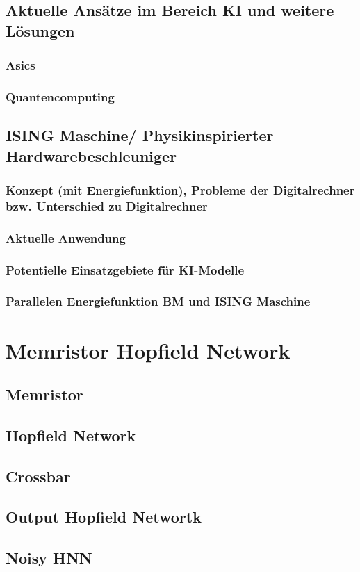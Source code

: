 \subsection{Aktuelle Ansätze im Bereich KI und weitere Lösungen}
\subsubsection{Asics}
\subsubsection{Quantencomputing}
\subsection{ISING Maschine/ Physikinspirierter Hardwarebeschleuniger}
\subsubsection{Konzept (mit Energiefunktion), Probleme der Digitalrechner bzw. Unterschied zu Digitalrechner}
\subsubsection{Aktuelle Anwendung}
\subsubsection{Potentielle Einsatzgebiete für KI-Modelle}
\subsubsection{Parallelen Energiefunktion BM und ISING Maschine}

\section{Memristor Hopfield Network}
\subsection{Memristor}
\subsection{Hopfield Network}
\subsection{Crossbar}
\subsection{Output Hopfield Networtk}
\subsection{Noisy HNN}
